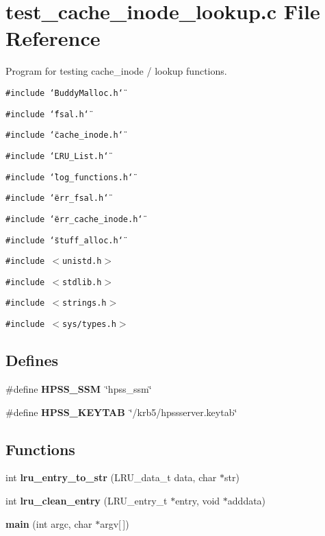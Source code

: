 \section{test\_\-cache\_\-inode\_\-lookup.c File Reference}
\label{test__cache__inode__lookup_8c}
Program for testing cache\_\-inode / lookup functions. 

{\tt \#include \char`\"{}Buddy\-Malloc.h\char`\"{}}\par
{\tt \#include \char`\"{}fsal.h\char`\"{}}\par
{\tt \#include \char`\"{}cache\_\-inode.h\char`\"{}}\par
{\tt \#include \char`\"{}LRU\_\-List.h\char`\"{}}\par
{\tt \#include \char`\"{}log\_\-functions.h\char`\"{}}\par
{\tt \#include \char`\"{}err\_\-fsal.h\char`\"{}}\par
{\tt \#include \char`\"{}err\_\-cache\_\-inode.h\char`\"{}}\par
{\tt \#include \char`\"{}stuff\_\-alloc.h\char`\"{}}\par
{\tt \#include $<$unistd.h$>$}\par
{\tt \#include $<$stdlib.h$>$}\par
{\tt \#include $<$strings.h$>$}\par
{\tt \#include $<$sys/types.h$>$}\par
\subsection*{Defines}
\begin{CompactItemize}
\item 
\#define {\bf HPSS\_\-SSM}\ \char`\"{}hpss\_\-ssm\char`\"{}
\item 
\#define {\bf HPSS\_\-KEYTAB}\ \char`\"{}/krb5/hpssserver.keytab\char`\"{}
\end{CompactItemize}
\subsection*{Functions}
\begin{CompactItemize}
\item 
int {\bf lru\_\-entry\_\-to\_\-str} (LRU\_\-data\_\-t data, char $\ast$str)
\item 
int {\bf lru\_\-clean\_\-entry} (LRU\_\-entry\_\-t $\ast$entry, void $\ast$adddata)
\item 
{\bf main} (int argc, char $\ast$argv[$\,$])
\end{CompactItemize}


